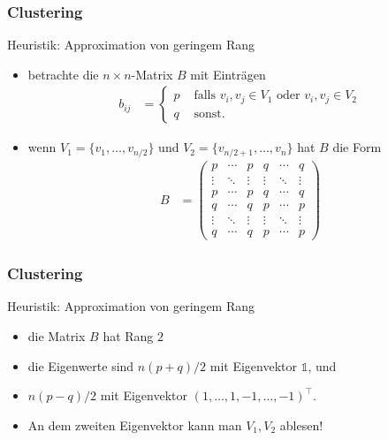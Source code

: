 \documentclass{beamer}
\newcommand{\vecone}{\mathbb{1}}
\newcommand{\trans}{\top}
\renewcommand{\ae}{\"a}
\newcommand{\mytitle}{Clustering}
\begin{document}
\begin{frame}\frametitle{\mytitle}
	\begin{block}{Heuristik: Approximation von geringem Rang}
		\begin{itemize}
			\item betrachte die $n\times n$-Matrix $B$ mit Eintr\ae gen
				\begin{align*}
					b_{ij}&=\begin{cases}p&\mbox{ falls $v_i,v_j\in V_1$ oder $v_i,v_j\in V_2$}\\q&\mbox{ sonst}.\end{cases}
				\end{align*}
			\item wenn $V_1=\{v_1,\ldots,v_{n/2}\}$ und $V_2=\{v_{n/2+1},\ldots,v_n\}$ hat $B$ die Form
				\begin{align*}
					B&=\begin{pmatrix}
						p&\cdots&p&q&\cdots&q\\
						\vdots&\ddots&\vdots&\vdots&\ddots&\vdots\\
						p&\cdots&p&q&\cdots&q\\
						q&\cdots&q&p&\cdots&p\\
						\vdots&\ddots&\vdots&\vdots&\ddots&\vdots\\
						q&\cdots&q&p&\cdots&p
					\end{pmatrix}
				\end{align*}
		\end{itemize}
	\end{block}
\end{frame}

\begin{frame}\frametitle{\mytitle}
	\begin{block}{Heuristik: Approximation von geringem Rang}
		\begin{itemize}
			\item die Matrix $B$ hat Rang $2$
			\item die Eigenwerte sind $n(p+q)/2$ mit Eigenvektor $\vecone$, und
			\item $n(p-q)/2$ mit Eigenvektor $(1,\ldots,1,-1,\ldots,-1)^\trans$.
			\item An dem zweiten Eigenvektor kann man $V_1,V_2$ ablesen!
		\end{itemize}
	\end{block}
\end{frame}
\end{document}
